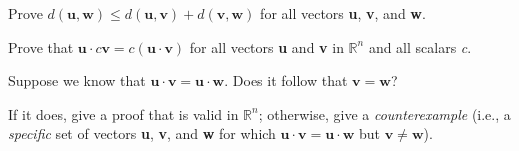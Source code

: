 \documentclass[12pt,letterpaper]{../hmcpset}
\begin{document}
\begin{solution}
\end{solution}
\newpage

\begin{problem}[56]
	Prove $d(\mathbf{u}, \mathbf{w}) \leq d(\mathbf{u}, \mathbf{v}) + d(\mathbf{v}, \mathbf{w})$ for all vectors \textbf{u}, \textbf{v}, and \textbf{w}. 
\end{problem}

\begin{solution}
\end{solution}
\newpage

\begin{problem}[58]
	Prove  that $\mathbf{u} \cdot \mathit{c}\mathbf{v} = \mathit{c}(\mathbf{u} \cdot \mathbf{v})$ for all vectors \textbf{u} and \textbf{v} in $\mathbb{R}^n$ and all scalars \textit{c}.
\end{problem}

\begin{solution}
\end{solution}
\newpage
	
\begin{problem}[60]
	Suppose we know that $\mathbf{u} \cdot \mathbf{v} = \mathbf{u} \cdot \mathbf{w}$. Does it follow that $\mathbf{v} = \mathbf{w}$?
	
	If it does, give a proof that is valid in $\mathbb{R}^n$; otherwise, give a \textit{counterexample} (i.e., a \textit{specific} set of vectors \textbf{u}, \textbf{v}, and \textbf{w} for which $\mathbf{u} \cdot \mathbf{v} = \mathbf{u} \cdot \mathbf{w}$ but $\mathbf{v} \neq \mathbf{w}$). 
\end{problem}

\begin{solution}
\end{solution}
\newpage
\end{document}
